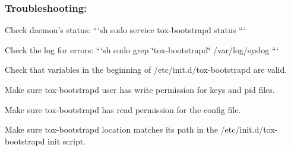 \label{_initd-troubleshooting}%
 \subsubsection*{Troubleshooting\+:}


\begin{DoxyItemize}
\item Check daemon's status\+: ```sh sudo service tox-\/bootstrapd status ```
\item Check the log for errors\+: ```sh sudo grep \char`\"{}tox-\/bootstrapd\char`\"{} /var/log/syslog ```
\item Check that variables in the beginning of {\ttfamily /etc/init.d/tox-\/bootstrapd} are valid.
\item Make sure tox-\/bootstrapd user has write permission for keys and pid files.
\item Make sure tox-\/bootstrapd has read permission for the config file.
\item Make sure tox-\/bootstrapd location matches its path in the {\ttfamily /etc/init.d/tox-\/bootstrapd} init script. 
\end{DoxyItemize}